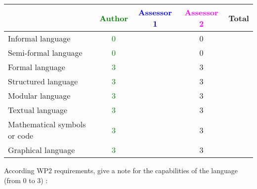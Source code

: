 \begin{tabular}{|l | c | c | c | c|}
\hline
& \textcolor{green}{Author} & \textcolor{blue}{Assessor 1} & \textcolor{magenta}{Assessor 2} & Total \\
\hline 
Informal language &  \textcolor{green}{0}  & &0 &  \\
\hline 
Semi-formal language &  \textcolor{green}{0}  & &0 &  \\
\hline
Formal language &  \textcolor{green}{3}  & &3 &  \\
\hline
Structured language &  \textcolor{green}{3}  & &3 & \\
\hline
Modular language &  \textcolor{green}{3}  & &3 & \\
\hline
Textual language & \textcolor{green}{3} & &3 & \\
\hline
Mathematical symbols or code & \textcolor{green}{3} & &3 & \\
\hline
Graphical language & \textcolor{green}{3} & &3 & \\
\hline
\end{tabular}

According WP2 requirements, give a note for the capabilities of the language (from 0 to 3) :

